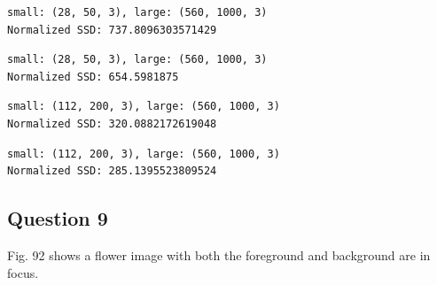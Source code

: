 \documentclass[10pt]{article}
\begin{document}
    \begin{Verbatim}[commandchars=\\\{\}]
small: (28, 50, 3), large: (560, 1000, 3)
Normalized SSD: 737.8096303571429
    \end{Verbatim}

    \begin{center}
    \end{center}
    
    \begin{Verbatim}[commandchars=\\\{\}]
small: (28, 50, 3), large: (560, 1000, 3)
Normalized SSD: 654.5981875
    \end{Verbatim}

    \begin{center}
    \end{center}
    
    \begin{Verbatim}[commandchars=\\\{\}]
small: (112, 200, 3), large: (560, 1000, 3)
Normalized SSD: 320.0882172619048
    \end{Verbatim}

    \begin{center}
    \end{center}
    
    \begin{Verbatim}[commandchars=\\\{\}]
small: (112, 200, 3), large: (560, 1000, 3)
Normalized SSD: 285.1395523809524
    \end{Verbatim}

    \begin{center}
    \end{center}
    

\subsection{Question 9}\label{question-9}

Fig. 92 shows a flower image with both the foreground and background are
in focus.
\end{document}
